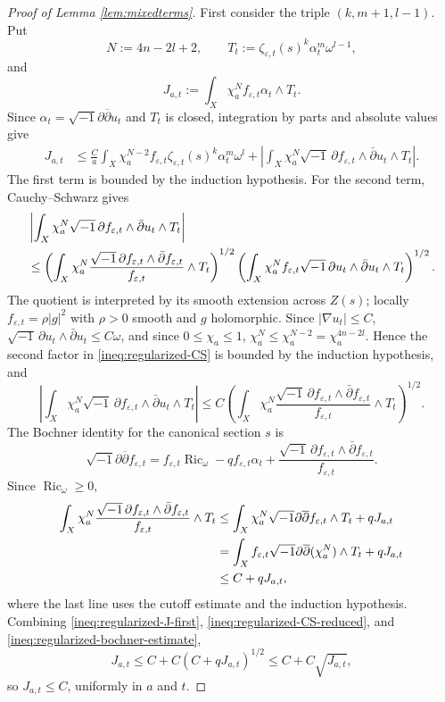 \documentclass[11pt]{amsart}
\numberwithin{equation}{section}
\newcommand{\Ric}{\operatorname{Ric}}
\newcommand{\vep}{\varepsilon}
\renewcommand{\d}{\partial}
\newcommand{\ddbar}{\sqrt{-1}\d\overline{\d}}
\theoremstyle{plain}
\theoremstyle{remark}
\begin{document}
\begin{proof}[Proof of Lemma \ref{lem:mixedterms}]
First consider the triple $(k,m+1,l-1)$.  Put
\[
        N:=4n-2l+2,
        \qquad
        T_t:=\zeta_{\vep,t}(s)^k\alpha_t^m\omega^{l-1},
\]
and
\[
        J_{a,t}:=\int_X\chi_a^N f_{\vep,t}\alpha_t\wedge T_t .
\]
Since $\alpha_t=\ddbar u_t$ and $T_t$ is closed, integration by parts and absolute values give
\begin{align}
J_{a,t}
&\leq \frac{C}{a}\int_X\chi_a^{N-2}f_{\vep,t}\zeta_{\vep,t}(s)^k\alpha_t^m\omega^l
+
\left|\int_X\chi_a^N\sqrt{-1}\,\partial f_{\vep,t}\wedge\bar\partial u_t\wedge T_t\right| .
\label{ineq:regularized-J-first}
\end{align}
The first term is bounded by the induction hypothesis.  For the second term, Cauchy--Schwarz gives
\begin{align}
&\left|\int_X\chi_a^N\sqrt{-1}\,\partial f_{\vep,t}\wedge\bar\partial u_t\wedge T_t\right|        \notag\\
&\leq
\left(\int_X\chi_a^N
\frac{\sqrt{-1}\,\partial f_{\vep,t}\wedge\bar\partial f_{\vep,t}}{f_{\vep,t}}
\wedge T_t\right)^{1/2}
\left(\int_X\chi_a^N f_{\vep,t}\sqrt{-1}\,\partial u_t\wedge\bar\partial u_t\wedge T_t\right)^{1/2}.
\label{ineq:regularized-CS}
\end{align}
The quotient is interpreted by its smooth extension across $Z(s)$; locally $f_{\vep,t}=\rho |g|^2$ with $\rho>0$ smooth and $g$ holomorphic.  Since $|\nabla u_t|\leq C$,
$\sqrt{-1}\,\partial u_t\wedge\bar\partial u_t\leq C\omega$, and since $0\leq\chi_a\leq1$,
$\chi_a^N\leq\chi_a^{N-2}=\chi_a^{4n-2l}$.  Hence the second factor in \eqref{ineq:regularized-CS} is bounded by the induction hypothesis, and
\begin{equation}\label{ineq:regularized-CS-reduced}
\left|\int_X\chi_a^N\sqrt{-1}\,\partial f_{\vep,t}\wedge\bar\partial u_t\wedge T_t\right|
\leq
C\left(\int_X\chi_a^N
\frac{\sqrt{-1}\,\partial f_{\vep,t}\wedge\bar\partial f_{\vep,t}}{f_{\vep,t}}
\wedge T_t\right)^{1/2}.
\end{equation}
The Bochner identity for the canonical section $s$ is
\[
\ddbar f_{\vep,t}
=f_{\vep,t}\Ric_\omega-qf_{\vep,t}\alpha_t
+\frac{\sqrt{-1}\,\partial f_{\vep,t}\wedge\bar\partial f_{\vep,t}}{f_{\vep,t}}.
\]
Since $\Ric_\omega\geq0$,
\begin{align}
\int_X\chi_a^N
\frac{\sqrt{-1}\,\partial f_{\vep,t}\wedge\bar\partial f_{\vep,t}}{f_{\vep,t}}\wedge T_t
&\leq
\int_X\chi_a^N\ddbar f_{\vep,t}\wedge T_t+qJ_{a,t}                                      \notag\\
&=\int_X f_{\vep,t}\ddbar(\chi_a^N)\wedge T_t+qJ_{a,t}                                  \notag\\
&\leq C+qJ_{a,t},\label{ineq:regularized-bochner-estimate}
\end{align}
where the last line uses the cutoff estimate and the induction hypothesis.  Combining \eqref{ineq:regularized-J-first}, \eqref{ineq:regularized-CS-reduced}, and \eqref{ineq:regularized-bochner-estimate},
\[
        J_{a,t}\leq C+C(C+qJ_{a,t})^{1/2}\leq C+C\sqrt{J_{a,t}},
\]
so $J_{a,t}\leq C$, uniformly in $a$ and $t$.


\end{proof}
\end{document}
